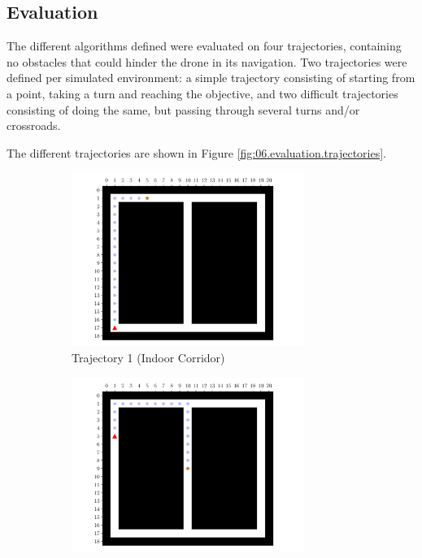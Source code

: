 \subsection{Evaluation}

The different algorithms defined were evaluated on four trajectories, containing no obstacles that could hinder the drone in its navigation. Two trajectories were defined per simulated environment: a simple trajectory consisting of starting from a point, taking a turn and reaching the objective, and two difficult trajectories consisting of doing the same, but passing through several turns and/or crossroads.

The different trajectories are shown in Figure \ref{fig:06.evaluation.trajectories}.

\begin{figure}[H]
    \centering
    \begin{subfigure}{0.49\textwidth}
        \centering
        \includegraphics[width=0.83\textwidth]{resources/pdf/06/evaluation/indoor-corridor/0.pdf}
        \caption{Trajectory 1 (Indoor Corridor)}
        \vspace{0.5em}
    \end{subfigure}
    \hfill
    \begin{subfigure}{0.49\textwidth}
        \centering
        \includegraphics[width=0.83\textwidth]{resources/pdf/06/evaluation/indoor-corridor/1.pdf}

\end{subfigure}
\end{figure}
